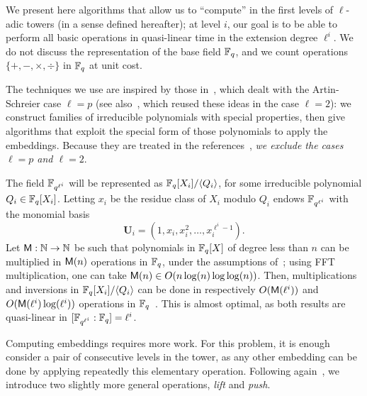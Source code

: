 \documentclass{sig-alternate}
\newcommand{\uu}{\mathbf{U}}  %
\begin{document}
We present here algorithms that allow us to ``compute'' in the
first levels of $\ell$-adic towers (in a sense defined hereafter); at
level $i$, our goal is to be able to perform all basic operations in
quasi-linear time in the extension degree $\ell^i$.  We do not discuss
the representation of the base field $\mathbb{F}_q$, and we count 
operations $\{+,-,\times,\div\}$ in $\mathbb{F}_q$ at unit cost.


The techniques we use are inspired by those in~\cite{df+schost12},
which dealt with the Artin-Schreier case $\ell=p$ (see
also~\cite{DoSc12}, which reused these ideas in the case $\ell=2$): we
construct families of irreducible polynomials with special properties,
then give algorithms that exploit the special form of those
polynomials to apply the embeddings. Because they are treated in the
references~\cite{df+schost12,DoSc12}, {\em we exclude the cases $\ell=p$
and $\ell=2$}.

The field $\mathbb{F}_{q^{\ell^i}}$ will be represented as $\mathbb{F}_q[X_i]/\langle
Q_i\rangle$, for some irreducible polynomial $Q_i \in
\mathbb{F}_q[X_i]$. Letting $x_i$ be the residue class of $X_i$ modulo $Q_i$
endows $\mathbb{F}_{q^{\ell^i}}$ with the monomial basis
\begin{equation}
  \label{eq:uni-basis1}
  \uu_i = (1,x_{i},x_{i}^2,\ldots,x_{i}^{\ell^{i}-1}).
\end{equation}
Let $\mathsf{M} : \mathbb{N} \rightarrow
\mathbb{N}$ be such that polynomials in $\mathbb{F}_q[X]$ of degree less than $n$ can
be multiplied in $\mathsf{M}(n)$ operations in $\mathbb{F}_q$, under the
assumptions of~\cite[Ch.~8.3]{vzGG}; using FFT multiplication, one can
take $\mathsf{M}(n)\in O(n\log (n) \log\log (n))$. Then, multiplications and
inversions in $\mathbb{F}_q[X_i]/\langle Q_i \rangle$ can be done in
respectively $O(\mathsf{M}(\ell^i))$ and $O(\mathsf{M}(\ell^i)\log(\ell^i))$
operations in $\mathbb{F}_q$~\cite[Ch.~9-11]{vzGG}. This is almost optimal, as
both results are quasi-linear in $[\mathbb{F}_{q^{\ell^i}}:\mathbb{F}_q]=\ell^i$.

Computing embeddings requires more work. For this problem, it is
enough consider a pair of consecutive levels in the tower, as any
other embedding can be done by applying repeatedly this elementary
operation. Following again~\cite{df+schost12}, we introduce two
slightly more general operations, {\em lift} and {\em push}.
\end{document}
